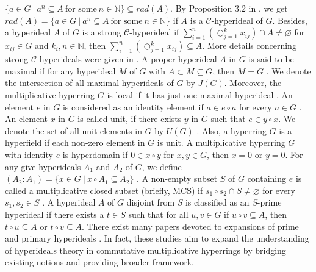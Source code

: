 \documentclass[preprint,review,10pt]{amsart}
\theoremstyle{definition}
\theoremstyle{remark}
\numberwithin{equation}{section}
\begin{document}
 $\{a \in G \ \vert \  a^n \subseteq A \ \text{for some} \ n \in \mathbb{N}\} \subseteq rad(A)$. By Proposition 3.2 in \cite{das}, we get  $rad(A)=\{a \in G \ \vert \  a^n \subseteq A \ \text{for some} \ n \in \mathbb{N}\}$ if $A$ is a $\mathcal{C}$-hyperideal of $G$. Besides, a hyperideal $A$ of $G$ is  a strong $\mathcal{C}$-hyperideal if $\sum_{i=1}^n(\bigcirc_{j=1}^k x_{ij}) \cap A \neq \varnothing$ for $x_{ij} \in G$ and  $k_i, n \in  \mathbb{N}$, then  $\sum_{i=1}^n(\bigcirc_{j=1}^k x_{ij}) \subseteq  A$. More details concerning strong $\mathcal{C}$-hyperideals were given in  \cite{phd}.   A proper hyperideal $A$ in $G$ is said to be maximal  if for any hyperideal $M$ of $G$ with $A \subset M \subseteq G$, then $M = G$ \cite{ameri}. We denote the intersection of all maximal hyperideals of $G$  by $J(G)$. Moreover, the multiplicative hyperring $G$ is local  if it has just one maximal hyperideal \cite{ameri}.   An element $e$ in $ G$ is considered as an identity element if $a \in e\circ a$ for every  $a \in G$ \cite{ameri}. An element $x$ in $ G$ is called unit, if there exists $y $ in $ G$ such that $e \in y \circ x$.  We denote the set of all unit elements in $G$ by $U(G)$  \cite{ameri}. Also, a hyperring $G$ is a hyperfield if each non-zero element in $G$ is unit. A multiplicative hyperring  $G$ with identity $e$ is  hyperdomain if $0 \in x \circ y$ for  $x,y \in G$, then $x=0$ or $y=0$.
For any give hyperideals  $A_1$ and $A_2$   of $G$, we define $(A_2:A_1)=\{x \in G \ \vert \ x \circ A_1 \subseteq A_2\}$ \cite{ameri}. 
A non-empty subset $S$ of $G$ containing $e$ is called a multiplicative closed subset (briefly, MCS) if $s_1 \circ s_2 \cap S \neq \varnothing$ for every $s_1,s_2 \in S$ \cite{Ghiasvand}. A hyperideal $A$ of $G$ disjoint from $S$ is classified as an $S$-prime hyperideal if there exists a $t \in S$ such that for all $u,v \in G$ if $u \circ v \subseteq A$, then $t \circ u \subseteq A$ or $t \circ v \subseteq A$\cite{Ghiasvand}. There exist many papers devoted to expansions of  prime and primary hyperideals \cite{Ay, far, Ghiasvand2, Mena, Sen,ul}. In fact, these studies aim  to expand the understanding of hyperideals theory in commutative multiplicative hyperrings by  bridging  existing notions and providing  broader framework.
\end{document}
